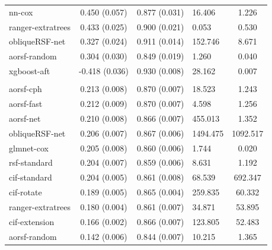 \documentclass[twoside,11pt]{article}\usepackage[]{graphicx}\usepackage[]{xcolor}
\newenvironment{knitrout}{}{} %
\begin{document}
\begin{knitrout}
\begin{longtable}[t]{lcclc}
\hspace{1em}nn-cox & 0.450 (0.057) & 0.877 (0.031) & 16.406 & 1.226\\
\hspace{1em}ranger-extratrees & 0.433 (0.025) & 0.900 (0.021) & 0.053 & 0.530\\
\hspace{1em}obliqueRSF-net & 0.327 (0.024) & 0.911 (0.014) & 152.746 & 8.671\\
\hspace{1em}aorsf-random & 0.304 (0.030) & 0.849 (0.019) & 1.260 & 0.040\\
\hspace{1em}xgboost-aft & -0.418 (0.036) & 0.930 (0.008) & 28.162 & 0.007\\
\addlinespace[0.3em]
\hline
\multicolumn{5}{l}{\textit{\textbf{Non-alcohol fatty liver disease; death, n = 17549, p = 24}}}\\
\hline
\hspace{1em}aorsf-cph & 0.213 (0.008) & 0.870 (0.007) & 18.523 & 1.243\\
\hspace{1em}aorsf-fast & 0.212 (0.009) & 0.870 (0.007) & 4.598 & 1.256\\
\hspace{1em}aorsf-net & 0.210 (0.008) & 0.866 (0.007) & 455.013 & 1.352\\
\hspace{1em}obliqueRSF-net & 0.206 (0.007) & 0.867 (0.006) & 1494.475 & 1092.517\\
\hspace{1em}glmnet-cox & 0.205 (0.008) & 0.860 (0.006) & 1.744 & 0.020\\
\hspace{1em}rsf-standard & 0.204 (0.007) & 0.859 (0.006) & 8.631 & 1.192\\
\hspace{1em}cif-standard & 0.204 (0.005) & 0.861 (0.008) & 68.539 & 692.347\\
\hspace{1em}cif-rotate & 0.189 (0.005) & 0.865 (0.004) & 259.835 & 60.332\\
\hspace{1em}ranger-extratrees & 0.180 (0.004) & 0.861 (0.007) & 34.871 & 53.895\\
\hspace{1em}cif-extension & 0.166 (0.002) & 0.866 (0.007) & 123.805 & 52.483\\
\hspace{1em}aorsf-random & 0.142 (0.006) & 0.844 (0.007) & 10.215 & 1.365\\

\end{longtable}
\end{knitrout}
\end{document}
